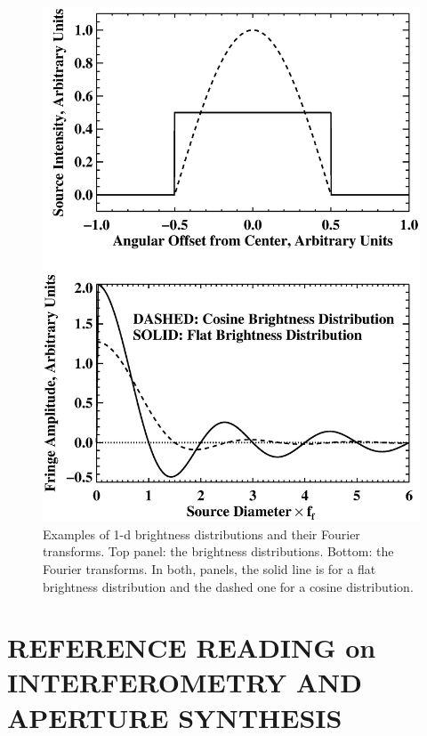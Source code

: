 \documentclass[11pt,preprint]{aastex}
\begin{document}
\begin{figure}[h!]
\begin{center}
\includegraphics[width=5.0in] {cosfringe.ps}
\end{center}
                                                                                
\caption{Examples of 1-d brightness distributions and their Fourier
transforms. Top panel: the brightness distributions. Bottom: the Fourier
transforms. In both, panels, the solid line is for a flat brightness
distribution and the dashed one for a cosine distribution. 
\label{cosfringe} } \end{figure}


\section {REFERENCE READING on INTERFEROMETRY AND APERTURE SYNTHESIS}
\end{document}

